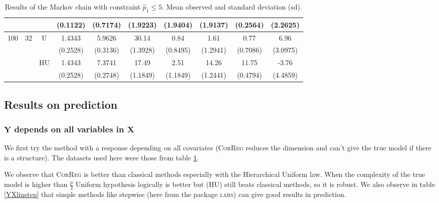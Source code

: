 \documentclass[11pt,a4paper]{article}
\begin{document}
\begin{table}[h!]
\begin{tabular}{|c|c|c|c|c|c|c|c|c|c|}
& & & (0.1122) & (0.7174) & (1.9223) & (1.9404) & (1.9137) & (0.2564) & (2.2625) \\
\hline %
100 & 32 & U& 1.4343 & 5.9626 & 30.14 & 0.84 & 1.61 & 0.77 & 6.96  \\
& & & (0.2528) & (0.3136) & (1.3928) & (0.8495) & (1.2941) & (0.7086) & (3.0975) \\
 &  &HU & 1.4343 & 7.3741 & 17.49 & 2.51 & 14.26 & 11.75 & -3.76  \\
& & & (0.2528) & (0.2748) & (1.1849) & (1.1849) & (1.2441) & (0.4794) & (4.4859) \\
\hline
\end{tabular} 
\caption{Results of the Markov chain with  constraint $\hat{p}_1\leq 5$. Mean observed and standard deviation (sd). } \label{compZvrai}
\end{table}


\clearpage
\subsection{Results on prediction}
	\subsubsection{$\boldsymbol{Y}$ depends on all variables in $\boldsymbol{X}$}	 \label{tableMSEsimtout}	
We first try the method with a response depending on all covariates (\textsc{CorReg} reduces the dimension and can't give the true model if there is a structure). The datasets used here were those from table \ref{compZvrai}.

We observe that \textsc{CorReg} is better than classical methods especially with the Hierarchical Uniform law. When the complexity of the true model is higher than $\frac{p}{2}$ Uniform hypothesis logically is better but (HU) still beats classical methods, so it is robust. We also observe in table \ref{YXlinstep} that simple methods like stepwise (here from the package \textsc{lars}) can give good results in prediction.
\end{document}
